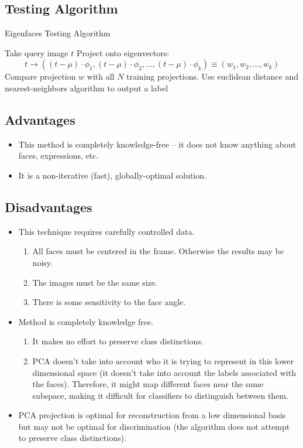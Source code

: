 \documentclass{article}
\begin{document}
\subsection{Testing Algorithm}
\begin{algorithm}
\caption{Eigenfaces Testing Algorithm \cite{eigenfaces}}\label{euclid}
\begin{algorithmic}[1]
\State Take query image $t$
\State Project onto eigenvectors:
$$t \rightarrow ((t - \mu) \cdot \phi_{1}, (t - \mu) \cdot \phi_{2}, ..., (t - \mu) \cdot \phi_{k}) \equiv (w_1, w_2, ..., w_k)$$
\State Compare projection $w$ with all $N$ training projections. Use euclidean distance and nearest-neighbors algorithm to output a label
\end{algorithmic}
\end{algorithm}

\subsection{Advantages}
\begin{itemize}
	\item This method is completely knowledge-free -- it does not know anything about faces, expressions, etc.
    \item It is a non-iterative (fast), globally-optimal solution.
\end{itemize}

\subsection{Disadvantages}
\begin{itemize}
	\item This technique requires carefully controlled data.
    \begin{enumerate}
    	\item All faces must be centered in the frame. Otherwise the results may be noisy.
        \item The images must be the same size.
        \item There is some sensitivity to the face angle.
    \end{enumerate}
    \item Method is completely knowledge free.
    \begin{enumerate}
    	\item It makes no effort to preserve class distinctions.
        \item PCA doesn't take into account who it is trying to represent in this lower dimensional space (it doesn't take into account the labels associated with the faces). Therefore, it might map different faces near the same subspace, making it difficult for classifiers to distinguish between them.
    \end{enumerate}
	\item PCA projection is optimal for reconstruction from a low dimensional basis but may not be optimal for discrimination (the algorithm does not attempt to preserve class distinctions).
\end{itemize}
\end{document}
